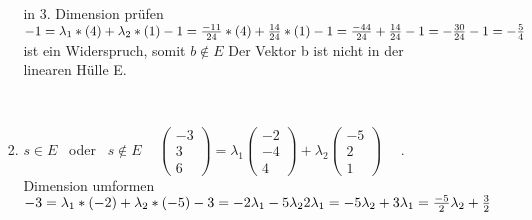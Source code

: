 \documentclass[10pt,ngerman]{scrartcl}
\begin{document}
\begin{enumerate}[1.]
\begin{enumerate}[(a)]
\begin{enumerate}
	in 3. Dimension prüfen \newline
	\begin{math}
	-1 = \lambda _1 * (4) + \lambda _2 * (1) \newline
	-1 =  \frac{-11}{24} * (4) + \frac{14}{24} * (1) \newline
	-1 =  \frac{-44}{24} + \frac{14}{24} \newline
	-1 =  -\frac{30}{24} \newline
	-1 =  -\frac{5}{4} 
	\end{math} ist ein Widerspruch, somit \begin{math}b \notin E \end{math}\newline
	Der Vektor b ist nicht in der linearen Hülle E.
	
	~\newline~
	
	\item \begin{math}s \in E\end{math} ~oder~ \begin{math}s \notin E \end{math}\newline
	 ~\newline
	\begin{math}\begin{pmatrix}-3 \\ 3 \\ 6\end{pmatrix} = \lambda _1 \begin{pmatrix}-2 \\ -4 \\ 4\end{pmatrix} + \lambda _2\begin{pmatrix}-5 \\ 2 \\ 1\end{pmatrix} \end{math}\newline
	 ~\newline~. Dimension umformen\newline
	\begin{math}
	-3 = \lambda _1 * (-2) + \lambda _2 * (-5) \newline
	-3 = -2 \lambda _1  - 5 \lambda _2 \newline
	2 \lambda _1 = -5 \lambda _2 + 3 \newline
	\lambda _1 = \frac{-5}{2} \lambda _2 + \frac{3}{2}
	\end{math}
	

\end{enumerate}
\end{enumerate}
\end{enumerate}
\end{document}
